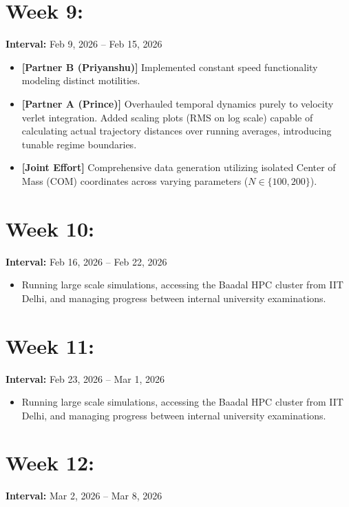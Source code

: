 \documentclass[11pt]{article}
\begin{document}
\section*{Week 9: }
\textbf{Interval:} Feb 9, 2026 -- Feb 15, 2026

\begin{itemize}[noitemsep]
    \item \textbf{[Partner B (Priyanshu)]} Implemented constant speed functionality modeling distinct motilities.
    \item \textbf{[Partner A (Prince)]} Overhauled temporal dynamics purely to velocity verlet integration. Added scaling plots (RMS on log scale) capable of calculating actual trajectory distances over running averages, introducing tunable regime boundaries.
    \item \textbf{[Joint Effort]} Comprehensive data generation utilizing isolated Center of Mass (COM) coordinates across varying parameters ($N \in \{100, 200\}$).
\end{itemize}

\section*{Week 10: }
\textbf{Interval:} Feb 16, 2026 -- Feb 22, 2026

\begin{itemize}[noitemsep]
    \item Running large scale simulations, accessing the Baadal HPC cluster from IIT Delhi, and managing progress between internal university examinations.
\end{itemize}

\section*{Week 11: }
\textbf{Interval:} Feb 23, 2026 -- Mar 1, 2026

\begin{itemize}[noitemsep]
    \item Running large scale simulations, accessing the Baadal HPC cluster from IIT Delhi, and managing progress between internal university examinations.
\end{itemize}

\section*{Week 12: }
\textbf{Interval:} Mar 2, 2026 -- Mar 8, 2026
\end{document}
